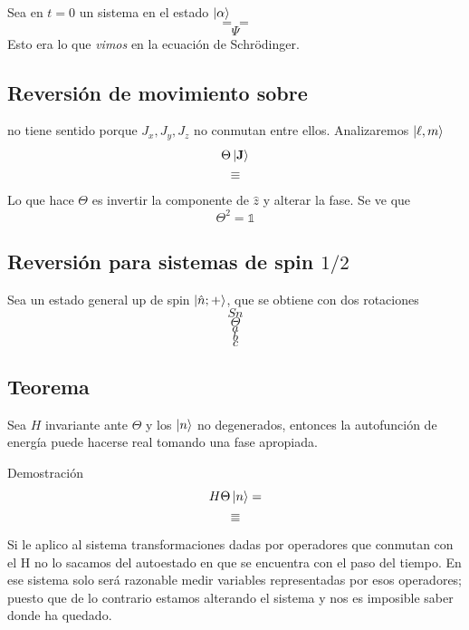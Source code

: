 \documentclass[10pt,oneside]{CBFT_book}
\begin{document}
Sea en $t=0$ un sistema en el estado $\Ket{\alpha}$
\[
	= = 
\]
\[
	\Psi
\]
Esto era lo que {\it vimos} en la ecuación de Schrödinger.

\subsection{Reversión de movimiento sobre }


no tiene sentido porque $J_x,J_y,J_z$ no conmutan entre ellos. Analizaremos $\Ket{\ell,m}$
\[
	\Theta \Ket{\vb{J}} 
\]
\[
	\equiv 
\]

Lo que hace $\Theta$ es invertir la componente de $\hat{z}$ y alterar la fase. Se ve que 
\[
	\Theta^2 = \mathbb{1}
\]

\subsection{Reversión para sistemas de spin $1/2$}

Sea un estado general up de spin $\Ket{\hat{n};+}$, que se obtiene con dos rotaciones 
\[
	Sn
\]
\[
	\Theta
\]
\[
	a
\]
\[
	b
\]
\[
	c
\]

\subsection{Teorema}

Sea $H$ invariante ante $\Theta$ y los $\Ket{n}$ no degenerados, entonces la autofunción de energía puede 
hacerse real tomando una fase apropiada.

Demostración 
\[
	H \Theta  \Ket{n} =
\]
\[
	=
\]
\[
	=
\]

Si le aplico al sistema transformaciones dadas por operadores que conmutan con el H no lo sacamos del 
autoestado en que se encuentra con el paso del tiempo.
En ese sistema solo será razonable medir variables representadas por esos operadores; puesto que de lo 
contrario estamos alterando el sistema y nos es imposible saber donde ha quedado.



\end{document}
